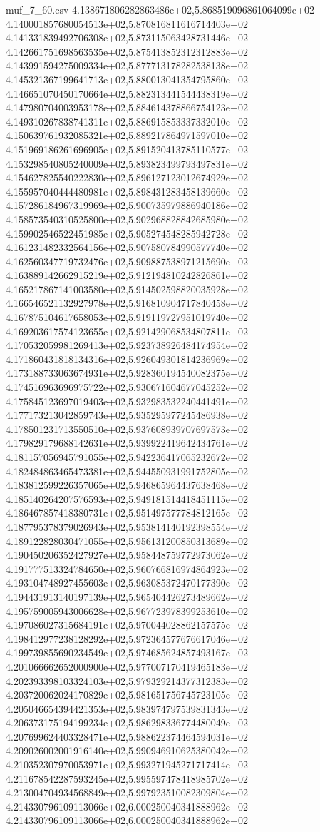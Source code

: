 \begin{filecontents*}{muf_7_60.csv}
4.138671806282863486e+02,5.868519096861064099e+02
4.140001857680054513e+02,5.870816811616714403e+02
4.141331839492706308e+02,5.873115063428731446e+02
4.142661751698563535e+02,5.875413852312312883e+02
4.143991594275009334e+02,5.877713178282538138e+02
4.145321367199641713e+02,5.880013041354795860e+02
4.146651070450170664e+02,5.882313441544438319e+02
4.147980704003953178e+02,5.884614378866754123e+02
4.149310267838741311e+02,5.886915853337332010e+02
4.150639761932085321e+02,5.889217864971597010e+02
4.151969186261696905e+02,5.891520413785110577e+02
4.153298540805240009e+02,5.893823499793497831e+02
4.154627825540222830e+02,5.896127123012674929e+02
4.155957040444480981e+02,5.898431283458139660e+02
4.157286184967319969e+02,5.900735979886940186e+02
4.158573540310525800e+02,5.902968828842685980e+02
4.159902546522451985e+02,5.905274548285942728e+02
4.161231482332564156e+02,5.907580784990577740e+02
4.162560347719732476e+02,5.909887538971215690e+02
4.163889142662915219e+02,5.912194810242826861e+02
4.165217867141003580e+02,5.914502598820035928e+02
4.166546521132927978e+02,5.916810904717840458e+02
4.167875104617658053e+02,5.919119727951019740e+02
4.169203617574123655e+02,5.921429068534807811e+02
4.170532059981269413e+02,5.923738926484174954e+02
4.171860431818134316e+02,5.926049301814236969e+02
4.173188733063674931e+02,5.928360194540082375e+02
4.174516963696975722e+02,5.930671604677045252e+02
4.175845123697019403e+02,5.932983532240441491e+02
4.177173213042859743e+02,5.935295977245486938e+02
4.178501231713550510e+02,5.937608939707697573e+02
4.179829179688142631e+02,5.939922419642434761e+02
4.181157056945791055e+02,5.942236417065232672e+02
4.182484863465473381e+02,5.944550931991752805e+02
4.183812599226357065e+02,5.946865964437638468e+02
4.185140264207576593e+02,5.949181514418451115e+02
4.186467857418380731e+02,5.951497577784812165e+02
4.187795378379026943e+02,5.953814140192398554e+02
4.189122828030471055e+02,5.956131200850313689e+02
4.190450206352427927e+02,5.958448759772973062e+02
4.191777513324784650e+02,5.960766816974864923e+02
4.193104748927455603e+02,5.963085372470177390e+02
4.194431913140197139e+02,5.965404426273489662e+02
4.195759005943006628e+02,5.967723978399253610e+02
4.197086027315684191e+02,5.970044028862157575e+02
4.198412977238128292e+02,5.972364577676617046e+02
4.199739855690234549e+02,5.974685624857493167e+02
4.201066662652000900e+02,5.977007170419465183e+02
4.202393398103324103e+02,5.979329214377312383e+02
4.203720062024170829e+02,5.981651756745723105e+02
4.205046654394421353e+02,5.983974797539831343e+02
4.206373175194199234e+02,5.986298336774480049e+02
4.207699624403328471e+02,5.988622374464594031e+02
4.209026002001916140e+02,5.990946910625380042e+02
4.210352307970053971e+02,5.993271945271717414e+02
4.211678542287593245e+02,5.995597478418985702e+02
4.213004704934568849e+02,5.997923510082309804e+02
4.214330796109113066e+02,6.000250040341888962e+02
4.214330796109113066e+02,6.000250040341888962e+02
\end{filecontents*}


